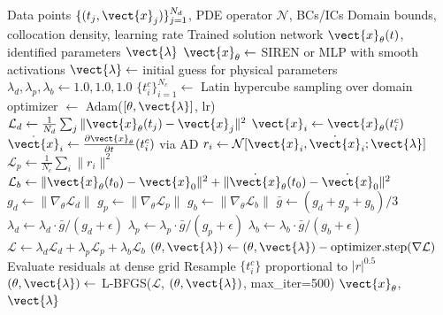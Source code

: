 \begin{algorithm}[H]
\caption{Physics-Informed Neural Network with Adaptive Loss Balancing}
\label{alg:pinn_adaptive}
\begin{algorithmic}[1]
\REQUIRE Data points $\{(t_j, \vect{x}_j)\}_{j=1}^{N_d}$, PDE operator $\mathcal{N}$, BCs/ICs
\REQUIRE Domain bounds, collocation density, learning rate
\ENSURE Trained solution network $\vect{x}_\theta(t)$, identified parameters $\vect{\lambda}$
\STATE
\STATE {}
\STATE $\vect{x}_\theta \gets$ SIREN or MLP with smooth activations
\STATE $\vect{\lambda} \gets$ initial guess for physical parameters
\STATE $\lambda_d, \lambda_p, \lambda_b \gets 1.0, 1.0, 1.0$ 
\STATE
\STATE {}
\STATE $\{t_i^c\}_{i=1}^{N_c} \gets$ Latin hypercube sampling over domain
\STATE
\STATE optimizer $\gets$ Adam($[\theta, \vect{\lambda}]$, lr)
\STATE
{}
    \STATE
    \STATE {}
    \STATE $\mathcal{L}_d \gets \frac{1}{N_d}\sum_j \|\vect{x}_\theta(t_j) - \vect{x}_j\|^2$
    \STATE
    \STATE {}
        \STATE $\vect{x}_i \gets \vect{x}_\theta(t_i^c)$
        \STATE $\dot{\vect{x}}_i \gets \frac{\partial \vect{x}_\theta}{\partial t}(t_i^c)$ via AD
        \STATE $r_i \gets \mathcal{N}[\vect{x}_i, \dot{\vect{x}}_i; \vect{\lambda}]$
    \ENDFOR
    \STATE $\mathcal{L}_p \gets \frac{1}{N_c}\sum_i \|r_i\|^2$
    \STATE
    \STATE {}
    \STATE $\mathcal{L}_b \gets \|\vect{x}_\theta(t_0) - \vect{x}_0\|^2 + \|\dot{\vect{x}}_\theta(t_0) - \dot{\vect{x}}_0\|^2$
    \STATE
    \STATE {}
        \STATE $g_d \gets \|\nabla_\theta \mathcal{L}_d\|$
        \STATE $g_p \gets \|\nabla_\theta \mathcal{L}_p\|$
        \STATE $g_b \gets \|\nabla_\theta \mathcal{L}_b\|$
        \STATE $\bar{g} \gets (g_d + g_p + g_b) / 3$
        \STATE $\lambda_d \gets \lambda_d \cdot \bar{g} / (g_d + \epsilon)$
        \STATE $\lambda_p \gets \lambda_p \cdot \bar{g} / (g_p + \epsilon)$
        \STATE $\lambda_b \gets \lambda_b \cdot \bar{g} / (g_b + \epsilon)$
    \ENDIF
    \STATE
    \STATE {}
    \STATE $\mathcal{L} \gets \lambda_d \mathcal{L}_d + \lambda_p \mathcal{L}_p + \lambda_b \mathcal{L}_b$
    \STATE $(\theta, \vect{\lambda}) \gets (\theta, \vect{\lambda}) - \text{optimizer.step}(\nabla \mathcal{L})$
    \STATE
    \STATE {}
        \STATE Evaluate residuals at dense grid
        \STATE Resample $\{t_i^c\}$ proportional to $|r|^{0.5}$
    \ENDIF
\ENDFOR
\STATE
\STATE {}
\STATE $(\theta, \vect{\lambda}) \gets$ L-BFGS($\mathcal{L}$, $(\theta, \vect{\lambda})$, max\_iter=500)
\RETURN $\vect{x}_\theta$, $\vect{\lambda}$
\end{algorithmic}
\end{algorithm}

